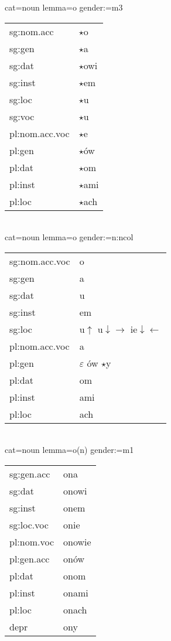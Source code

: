 \documentclass{article}
\begin{document}
\begin{multicols}{2}
cat=noun lemma=o gender:=m3\\
\begin{tabular}{l|l}
sg:nom.acc & $\star$o\\
sg:gen & $\star$a\\
sg:dat & $\star$owi\\
sg:inst & $\star$em\\
sg:loc & $\star$u\\
sg:voc & $\star$u\\
pl:nom.acc.voc & $\star$e\\
pl:gen & $\star$ów\\
pl:dat & $\star$om\\
pl:inst & $\star$ami\\
pl:loc & $\star$ach\\
\end{tabular}\\

cat=noun lemma=o gender:=n:ncol\\
\begin{tabular}{l|l}
sg:nom.acc.voc & o\\
sg:gen & a\\
sg:dat & u\\
sg:inst & em\\
sg:loc & u$\uparrow$ u$\downarrow\rightarrow$ ie$\downarrow\leftarrow$\\
pl:nom.acc.voc & a\\
pl:gen & $\varepsilon$ ów $\star$y\\
pl:dat & om\\
pl:inst & ami\\
pl:loc & ach\\
\end{tabular}\\

cat=noun lemma=o(n) gender:=m1\\
\begin{tabular}{l|l}
sg:gen.acc & ona\\
sg:dat & onowi\\
sg:inst & onem\\
sg:loc.voc & onie\\
pl:nom.voc & onowie\\
pl:gen.acc & onów\\
pl:dat & onom\\
pl:inst & onami\\
pl:loc & onach\\
depr & ony\\
\end{tabular}\\


\end{multicols}
\end{document}
